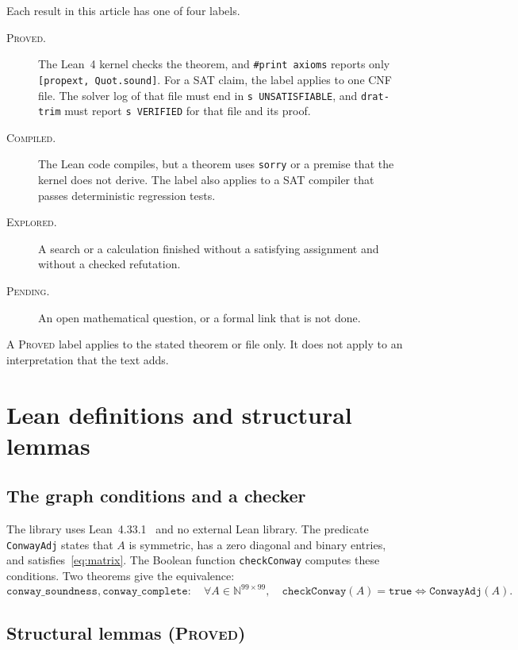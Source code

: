 \documentclass[pdflatex,sn-mathphys-num]{sn-jnl}
\theoremstyle{thmstyleone}
\theoremstyle{thmstyletwo}
\theoremstyle{thmstylethree}
\numberwithin{equation}{section}
\begin{document}
Each result in this article has one of four labels.
\begin{description}
 \item[\textsc{Proved}.] The Lean~4 kernel checks the theorem, and \texttt{\#print axioms} reports only \texttt{[propext, Quot.sound]}. For a SAT claim, the label applies to one CNF file. The solver log of that file must end in \texttt{s UNSATISFIABLE}, and \texttt{drat-trim} must report \texttt{s VERIFIED} for that file and its proof.
 \item[\textsc{Compiled}.] The Lean code compiles, but a theorem uses \texttt{sorry} or a premise that the kernel does not derive. The label also applies to a SAT compiler that passes deterministic regression tests.
 \item[\textsc{Explored}.] A search or a calculation finished without a satisfying assignment and without a checked refutation.
 \item[\textsc{Pending}.] An open mathematical question, or a formal link that is not done.
\end{description}
A \textsc{Proved} label applies to the stated theorem or file only. It does not apply to an interpretation that the text adds.

\section{Lean definitions and structural lemmas}

\subsection{The graph conditions and a checker}

The library uses Lean~4.33.1~\cite{moura2021lean4} and no external Lean library.
The predicate \texttt{ConwayAdj} states that $A$ is symmetric, has a zero diagonal and binary entries, and satisfies~\eqref{eq:matrix}.
The Boolean function \texttt{checkConway} computes these conditions. Two theorems give the equivalence:
\begin{equation}
 \texttt{conway\_soundness}, \texttt{conway\_complete}: \quad \forall A \in \mathbb{N}^{99 \times 99}, \quad \texttt{checkConway}(A) = \texttt{true} \iff \texttt{ConwayAdj}(A).
 \label{eq:checker}
\end{equation}

\subsection{Structural lemmas (\textsc{Proved})}
\end{document}
